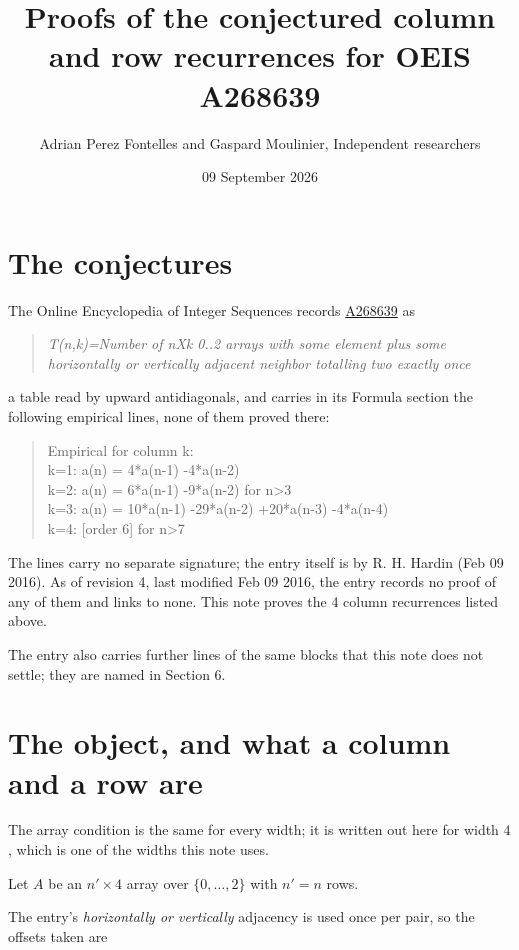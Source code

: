 \documentclass[11pt]{article}
\title{Proofs of the conjectured column and row recurrences for OEIS A268639}
\author{Adrian Perez Fontelles and Gaspard Moulinier, Independent researchers}
\date{09 September 2026}
\theoremstyle{definition}
\begin{document}
\maketitle
\section{The conjectures}

The Online Encyclopedia of Integer Sequences records \href{https://oeis.org/A268639}{A268639} as

\begin{quote}\itshape T(n,k)=Number of nXk 0..2 arrays with some element plus some horizontally or vertically adjacent neighbor totalling two exactly once\end{quote}

a table read by upward antidiagonals, and carries in its Formula section the following empirical lines, none of them proved there:

\begin{quote}\ttfamily Empirical for column k:\\
k=1: a(n) = 4*a(n-1) -4*a(n-2)\\k=2: a(n) = 6*a(n-1) -9*a(n-2) for n>3\\k=3: a(n) = 10*a(n-1) -29*a(n-2) +20*a(n-3) -4*a(n-4)\\k=4: [order 6] for n>7\end{quote}

The lines carry no separate signature; the entry itself is by R. H. Hardin (Feb 09 2016). As of revision 4, last modified Feb 09 2016, the entry records no proof of any of them and links to none. This note proves the 4 column recurrences listed above.

The entry also carries further lines of the same blocks that this note does not settle; they are named in Section 6.

\section{The object, and what a column and a row are}

The array condition is the same for every width; it is written out here for width $4$, which is one of the widths this note uses.

Let $A$ be an $n' \times 4$ array over $\{0,\dots,2\}$ with $n' = n$ rows.

The entry's {\itshape horizontally or vertically} adjacency is used once per pair, so the offsets taken are
\end{document}
